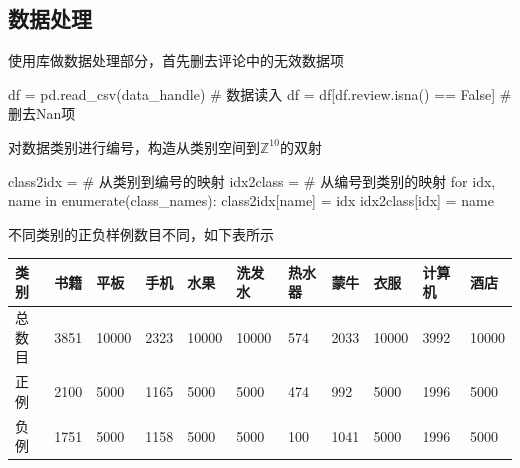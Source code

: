 \documentclass[12pt, a4paper, oneside]{ctexart}
\numberwithin{equation}{section}  %
\def\Z{\mathbb{Z}}          %
\begin{document}
\subsection{数据处理}
使用库做数据处理部分，首先删去评论中的无效数据项
\begin{pythoncode}
df = pd.read_csv(data_handle)  # 数据读入
df = df[df.review.isna() == False]  # 删去Nan项
\end{pythoncode}
对数据类别进行编号，构造从类别空间到$\Z^{10}$的双射
\begin{pythoncode}
class2idx = {}  # 从类别到编号的映射
idx2class = {}  # 从编号到类别的映射
for idx, name in enumerate(class_names):
    class2idx[name] = idx
    idx2class[idx] = name
\end{pythoncode}
不同类别的正负样例数目不同，如下表所示
\renewcommand\arraystretch{0.8} %
\begin{table}[!htbp] %
    \hspace{-0.8cm}
    \begin{tabular}{p{1.4cm}<{\centering}p{1cm}<{\centering}p{1cm}<{\centering}p{1cm}<{\centering}p{1cm}<{\centering}p{1.4cm}<{\centering}p{1.4cm}<{\centering}p{1cm}<{\centering}p{1cm}<{\centering}p{1.4cm}<{\centering}p{1cm}<{\centering}} %
        \toprule
类别  & 书籍   & 平板    & 手机   & 水果    & 洗发水   & 热水器 & 蒙牛   & 衣服    & 计算机  & 酒店    \\
        \midrule
总数目 & 3851 & 10000 & 2323 & 10000 & 10000 & 574 & 2033 & 10000 & 3992 & 10000 \\
正例  & 2100 & 5000  & 1165 & 5000  & 5000  & 474 & 992  & 5000  & 1996 & 5000  \\
负例  & 1751 & 5000  & 1158 & 5000  & 5000  & 100 & 1041 & 5000  & 1996 & 5000 \\
        \bottomrule
    \end{tabular}
\end{table}
\end{document}
